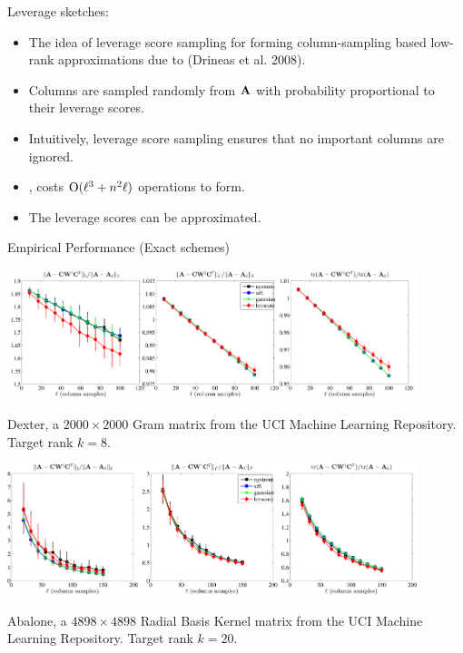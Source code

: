 \documentclass[xcolor=x11names,compress,ignorenonframetext,10pt]{beamer}
\renewcommand{\(}{\begin{columns}}
\renewcommand{\)}{\end{columns}}
\newcommand{\<}[1]{\begin{column}{#1}}
\renewcommand{\>}{\end{column}}
\def\refcolor{DodgerBlue4}
\newcommand{\refer}[1]{({\color{\refcolor}#1})}
\begin{document}
\begin{frame}

Leverage sketches:
 \begin{itemize}
 \item The idea of leverage score sampling for forming column-sampling based low-rank approximations due to \refer{Drineas et al. 2008}.
  \item Columns are sampled randomly from $\mathbf{A}$ with probability proportional to their leverage scores.
  \item Intuitively, leverage score sampling ensures that no important columns are ignored.
  \item {\color{red}{Assuming the leverage scores as given}}, costs $\mathrm{O}(\ell^3 + n^2 \ell)$ operations to form.
  \item The leverage scores can be approximated.
 \end{itemize}

\end{frame}

\begin{frame}{Empirical Performance (Exact schemes)}

  \centerline{\includegraphics[width=4.7in, keepaspectratio=true]{figures/spsd/Dexterrank8exact-methods-nonfixed-rank-errors-range}}

 Dexter, a $2000 \times 2000$ Gram matrix from the UCI Machine Learning Repository. 
 Target rank $k= 8.$
\end{frame}

\begin{frame}

  \centerline{\includegraphics[width=4.7in, keepaspectratio=true]{figures/spsd/Abalonesigma1exact-methods-nonfixed-rank-errors-range}}

 Abalone, a $4898 \times 4898$ Radial Basis Kernel matrix from the UCI Machine Learning Repository. 
 Target rank $k= 20.$ 
\end{frame}
\end{document}
